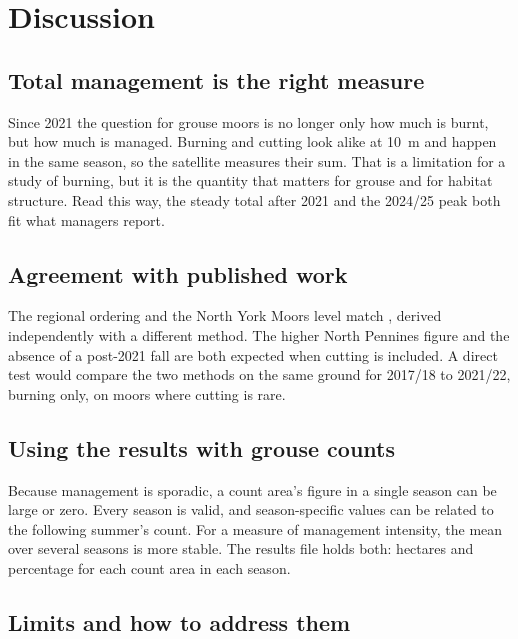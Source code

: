 \documentclass[11pt,a4paper]{article}
\begin{document}
\FloatBarrier
\section{Discussion}\label{sec:discussion}

\subsection{Total management is the right measure}

Since 2021 the question for grouse moors is no longer only how much is burnt, but how much is managed. Burning and cutting look alike at 10~m and happen in the same season, so the satellite measures their sum. That is a limitation for a study of burning, but it is the quantity that matters for grouse and for habitat structure. Read this way, the steady total after 2021 and the 2024/25 peak both fit what managers report.

\subsection{Agreement with published work}

The regional ordering and the North York Moors level match \citet{shewring2024}, derived independently with a different method. The higher North Pennines figure and the absence of a post-2021 fall are both expected when cutting is included. A direct test would compare the two methods on the same ground for 2017/18 to 2021/22, burning only, on moors where cutting is rare.

\subsection{Using the results with grouse counts}

Because management is sporadic, a count area's figure in a single season can be large or zero. Every season is valid, and season-specific values can be related to the following summer's count. For a measure of management intensity, the mean over several seasons is more stable. The results file holds both: hectares and percentage for each count area in each season.

\subsection{Limits and how to address them}
\end{document}
